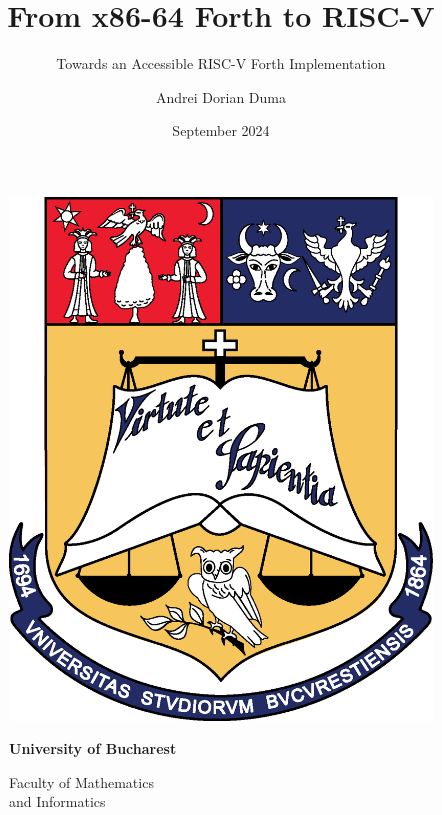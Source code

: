 \documentclass[presentation, bigger]{beamer}
\author{Andrei Dorian Duma}
\date{September 2024}
\title{From x86-64 Forth to RISC-V}
\subtitle{Towards an Accessible RISC-V Forth Implementation}
\begin{document}
{
  \vbox{}

  \vspace{-10pt}
  \begin{figure}[!htb]
    \centering
    \begin{minipage}{0.08\textwidth}\end{minipage}
    \begin{minipage}{0.16\textwidth}
      \includegraphics[width=\linewidth]{img/logo-ub.png}
    \end{minipage}
    \begin{minipage}{0.55\textwidth}
      \centering
      \textbf{University of Bucharest}\par
      \vspace{5pt}
      Faculty of Mathematics\\and Informatics
    \end{minipage}
    \begin{minipage}{0.175\textwidth}

\end{minipage}
\end{figure}}
\end{document}
